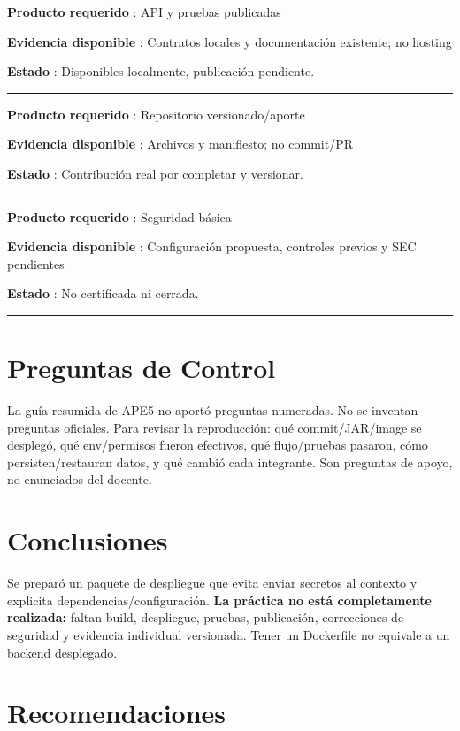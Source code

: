 \documentclass[11pt,a4paper]{article}
\begin{document}
\textbf{Producto requerido }: API y pruebas publicadas

\textbf{Evidencia disponible }: Contratos locales y documentación
existente; no hosting

\textbf{Estado }: Disponibles localmente, publicación pendiente.

\medskip\hrule\medskip

\textbf{Producto requerido }: Repositorio versionado/aporte

\textbf{Evidencia disponible }: Archivos y manifiesto; no commit/PR

\textbf{Estado }: Contribución real por completar y versionar.

\medskip\hrule\medskip

\textbf{Producto requerido }: Seguridad básica

\textbf{Evidencia disponible }: Configuración propuesta, controles
previos y SEC pendientes

\textbf{Estado }: No certificada ni cerrada.

\medskip\hrule\medskip

\section{Preguntas de Control}\label{APE5-semana-5-preguntas-de-control}

La guía resumida de APE5 no aportó preguntas numeradas. No se inventan
preguntas oficiales. Para revisar la reproducción: qué commit/JAR/image
se desplegó, qué env/permisos fueron efectivos, qué flujo/pruebas
pasaron, cómo persisten/restauran datos, y qué cambió cada integrante.
Son preguntas de apoyo, no enunciados del docente.

\section{Conclusiones}\label{APE5-semana-5-conclusiones}

Se preparó un paquete de despliegue que evita enviar secretos al
contexto y explicita dependencias/configuración. \textbf{La práctica no
está completamente realizada:} faltan build, despliegue, pruebas,
publicación, correcciones de seguridad y evidencia individual
versionada. Tener un Dockerfile no equivale a un backend desplegado.

\section{Recomendaciones}\label{APE5-semana-5-recomendaciones}
\end{document}
